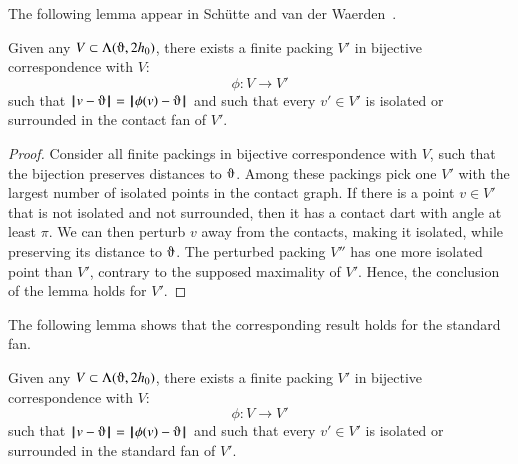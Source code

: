 The following lemma appear in Sch\"utte and van der Waerden~\cite{vanderWaerden:1951}.

\begin{lemma}
Given any $V\subset \Lambda(\orgn,2\hm)$,
there exists a finite packing $V'$ 
in bijective correspondence with $V$:
$$
\phi:V\to V'
$$
such that $\norm{v}{\orgn} = \norm{\phi(v)}{\orgn}$ and
such that every $v'\in V'$
is isolated or surrounded in the contact fan of $V'$.
\end{lemma}

\begin{proof} Consider all finite packings in 
bijective correspondence with $V$, such that the
bijection preserves distances to $\orgn$.
Among these packings pick one $V'$ with the largest number
of isolated points in the contact graph.  If there is a point $v\in V'$ that
is not isolated and not surrounded, then it has a contact
dart with angle at least $\pi$.  We can then perturb $v$ away from the contacts, making it isolated, while preserving its distance to $\orgn$.  The perturbed packing $V''$ has one more isolated point than $V'$, contrary to the supposed maximality of $V'$.  Hence, the conclusion of the 
lemma holds for $V'$.
\end{proof}

The following lemma shows that the corresponding result
holds for the standard fan.

\begin{lemma}\label{lemma:surrounded}  
Given any $V\subset \Lambda(\orgn,2\hm)$,
there exists a finite packing $V'$ 
in bijective correspondence with $V$:
$$
\phi:V\to V'
$$
such that $\norm{v}{\orgn} = \norm{\phi(v)}{\orgn}$ and
such that every $v'\in V'$
is isolated or surrounded in the standard fan of $V'$.
\end{lemma}

